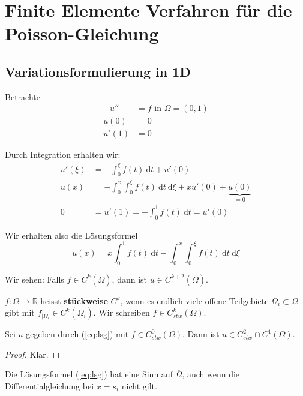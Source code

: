 \chapter{Finite Elemente Verfahren für die Poisson-Gleichung}
\section{Variationsformulierung in 1D}

Betrachte
\begin{align*}
-u'' &= f \text{ in } \Omega = (0,1) \\
u(0) &= 0 \\ 
u'(1) &= 0
\end{align*}

Durch Integration erhalten wir:
\begin{align*}
u'(\xi) &= - \int_0^\xi f(t) \ \mathrm dt + u'(0) \\
u(x) &= - \int_0^x \int_0^\xi f(t) \ \mathrm dt \ \mathrm d\xi + x u'(0) + \underbrace{u(0)}_{=0} \\
0 &= u'(1) = - \int_0^1 f(t) \ \mathrm dt = u'(0)
\end{align*}

Wir erhalten also die Lösungsformel
\[
u(x) = x \int_0^1 f(t) \ \mathrm dt - \int_0^x \int_0^\xi f(t) \ \mathrm dt \ \mathrm d\xi \label{eq:lsg}
\]

\begin{bem}
Wir sehen: Falls $f \in C^k(\overline \Omega)$, dann ist $u \in C^{k+2} (\overline \Omega)$.
\end{bem}

\begin{defi}
$f: \Omega \to \mathbb R$ heisst \textbf{stückweise} $C^k$, wenn es endlich viele offene 
Teilgebiete $\Omega_i \subset \Omega$ gibt mit $f_{|\Omega_i} \in C^k(\overline \Omega_i)$.
Wir schreiben $f \in C^k_{stw}(\Omega)$.
\end{defi}

\begin{satz}
Sei $u$ gegeben durch (\ref{eq:lsg}) mit $f \in C^0_{stw}(\Omega)$. Dann ist
$u \in C^2_{stw} \cap C^1(\Omega)$.
\end{satz}
\begin{proof}
Klar.
\end{proof}

\begin{bem}
Die Lösungsformel (\ref{eq:lsg}) hat eine Sinn auf $\overline \Omega$, auch wenn die 
Differentialgleichung bei $x = s_i$ nicht gilt.
\end{bem}


